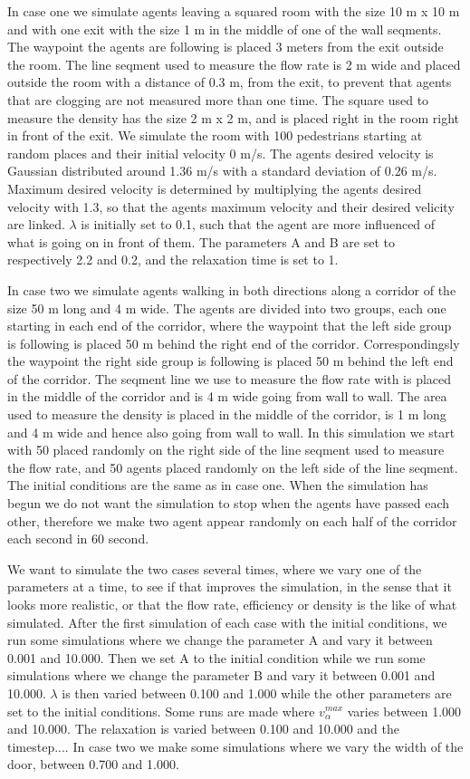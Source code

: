 In case one we simulate agents leaving a squared room with the size 10 m x 10 m and with one exit with the size 1 m in the middle of
one of the wall seqments. The waypoint the agents are following is placed 3 meters from the exit outside the room.
The line seqment used to measure the flow rate is 2 m wide and placed outside the room with a distance of 0.3 m,
from the exit, to prevent that agents that are clogging are not measured more than one time.
The square used to measure the density has the size 2 m x 2 m, and is placed right in the room right in front of the exit.
We simulate the room with 100 pedestrians starting at random places and their initial velocity 0 m/s.
The agents desired velocity is Gaussian distributed around 1.36 m/s with a standard deviation of 0.26 m/s.
Maximum desired velocity is determined by multiplying the agents desired velocity with 1.3, so that the agents
maximum velocity and their desired velicity are linked.
$\lambda$ is initially set to 0.1, such that the agent are more influenced of what is going on in front of them.
The parameters A and B are set to respectively 2.2 and 0.2, and the relaxation time is set to 1.

In case two we simulate agents walking in both directions along a corridor of the size 50 m long and 4 m wide.
The agents are divided into two groups, each one starting in each end of the corridor, where the waypoint that the
left side group is following is placed 50 m behind the right end of the corridor. Correspondingsly the waypoint
the right side group is following is placed 50 m behind the left end of the corridor.
The seqment line we use to measure the flow rate with is placed in the middle of the corridor and is 4 m wide going from wall to wall.
The area used to measure the density is placed in the middle of the corridor, is 1 m long and 4 m wide and hence
also going from wall to wall.
In this simulation we start with 50 placed randomly on the right side of the line seqment used to measure the flow rate,
and 50 agents placed randomly on the left side of the line seqment.
The initial conditions are the same as in case one.
When the simulation has begun we do not want the simulation to stop when the agents have passed each other, therefore we
make two agent appear randomly on each half of the corridor each second in 60 second.

We want to simulate the two cases several times, where we vary one of the parameters at a time, to see if that improves the simulation,
in the sense that it looks more realistic, or that the flow rate, efficiency or density is the like of what \cite{self-org} simulated.
After the first simulation of each case with the initial conditions, we run some simulations where we change the parameter A and vary
it between 0.001 and 10.000.
Then we set A to the initial condition while we run some simulations where we change the parameter B and vary it between 0.001 and 10.000.
$\lambda$ is then varied between 0.100 and 1.000 while the other parameters are set to the initial conditions.
Some runs are made where $v^{max}_{\alpha}$ varies between 1.000 and 10.000.
The relaxation is varied between 0.100 and 10.000 and the timestep....
In case two we make some simulations where we vary the width of the door, between 0.700 and 1.000.